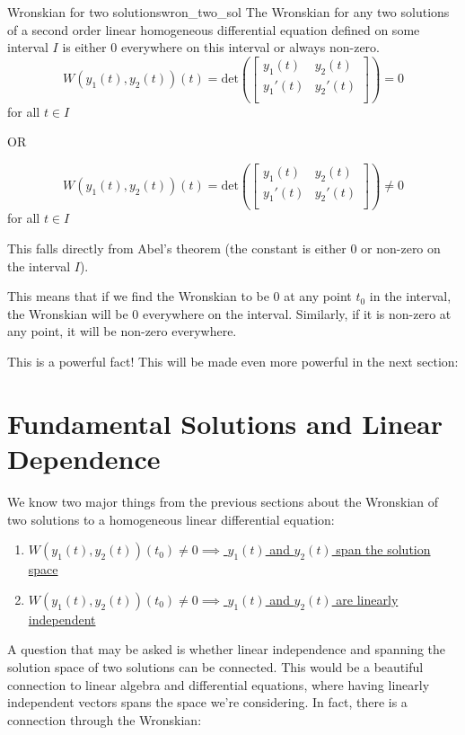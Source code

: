 \documentclass{report}
\begin{document}
\begin{mytheo}{Wronskian for two solutions}{wron_two_sol}
    The Wronskian for any two solutions of a second order linear homogeneous differential equation defined on some interval $I$ is either 0 everywhere on this interval or always non-zero.
    $$
    W(y_1(t), y_2(t))(t) = \text{det}\left(\begin{bmatrix}
    y_1(t) & y_2(t) \\
    y_1'(t) & y_2'(t) \\
    \end{bmatrix}\right) = 0
    $$
    for all $t \in I$
    
    OR
    
    $$
    W(y_1(t), y_2(t))(t) = \text{det}\left(\begin{bmatrix}
    y_1(t) & y_2(t) \\
    y_1'(t) & y_2'(t) \\
    \end{bmatrix}\right) \neq 0
    $$
    for all $t \in I$
\end{mytheo}

This falls directly from Abel's theorem (the constant is either 0 or non-zero on the interval $I$). 

This means that if we find the Wronskian to be 0 at any point $t_0$ in the interval, the Wronskian will be 0 everywhere on the interval. Similarly, if it is non-zero at any point, it will be non-zero everywhere. 

This is a powerful fact! This will be made even more powerful in the next section:

\section{Fundamental Solutions and Linear Dependence}
We know two major things from the previous sections about the Wronskian of two solutions to a homogeneous linear differential equation:
\begin{enumerate}
    \item \hyperref[th:unHomSol]{$W(y_1(t), y_2(t))(t_0)\neq 0 \implies $ $y_1(t)$ and $y_2(t)$ span the solution space}
    \item \hyperref[th:wronLinInd]{$W(y_1(t), y_2(t))(t_0)\neq 0 \implies $ $y_1(t)$ and $y_2(t)$ are linearly independent}
\end{enumerate}

A question that may be asked is whether linear independence and spanning the solution space of two solutions can be connected. This would be a beautiful connection to linear algebra and differential equations, where having linearly independent vectors spans the space we're considering. In fact, there is a connection through the Wronskian:
\end{document}
